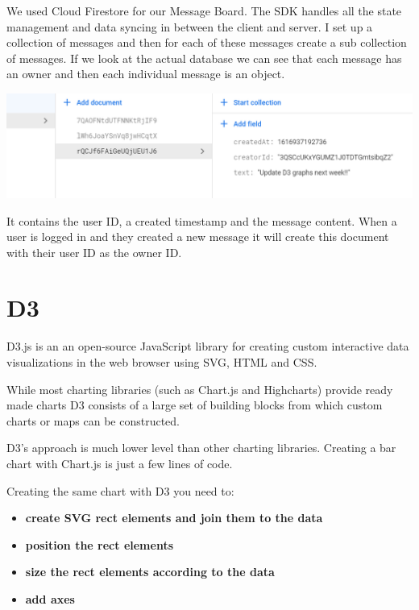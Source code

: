 We used Cloud Firestore for our Message Board.
The SDK handles all the state management and data syncing in between the client and server. I set up a collection of messages and then for each of these messages create a sub collection of messages. 
If we look at the actual database we can see that each message has an owner and then each individual message is an object.

\begin{center}    
      \includegraphics[scale=0.6]{img/FirestoreMessage.PNG}
\end{center}

It contains the user ID, a created timestamp and the message content.
When a user is logged in and they created a new message it will create this document with their user ID as the owner ID.

\section{D3}
D3.js is an an open-source JavaScript library for creating custom interactive data visualizations in the web browser using SVG, HTML and CSS. 

While most charting libraries (such as Chart.js and Highcharts) provide ready made charts D3 consists of a large set of building blocks from which custom charts or maps can be constructed.

D3’s approach is much lower level than other charting libraries. Creating a bar chart with Chart.js is just a few lines of code.

Creating the same chart with D3 you need to:

\begin{itemize}

\item \textbf{create SVG rect elements and join them to the data}
\item \textbf{position the rect elements}
\item \textbf{size the rect elements according to the data}
\item \textbf{add axes}

\end{itemize}


